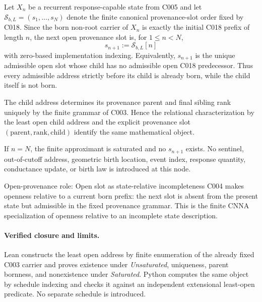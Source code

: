 Let $X_n$ be a recurrent response-capable state from C005 and let
$\mathcal S_{b,L}=(s_1,\ldots,s_N)$ denote the finite canonical provenance-slot
order fixed by C018.  Since the born non-root carrier of $X_n$ is exactly
the initial C018 prefix of length $n$, the next open provenance slot is, for
$1\le n<N$,
\[
  s_{n+1}:=\mathcal S_{b,L}[n]
\]
with zero-based implementation indexing.  Equivalently, $s_{n+1}$ is the
unique admissible open slot whose child has no admissible open C018 predecessor.
Thus every admissible address strictly before its child is already born, while
the child itself is not born.

The child address determines its provenance parent and final sibling rank
uniquely by the finite grammar of C003.  Hence the relational
characterization by the least open child address and the explicit provenance
slot $(\mathrm{parent},\mathrm{rank},\mathrm{child})$ identify the same
mathematical object.

If $n=N$, the finite approximant is saturated and no $s_{n+1}$ exists.  No
sentinel, out-of-cutoff address, geometric birth location, event index, response
quantity, conductance update, or birth law is introduced at this node.

\begin{cnnaInfoBox}{Open-provenance role: Open slot as state-relative incompleteness}
C004 makes openness relative to a current born prefix: the next slot is absent from the present state but admissible in the fixed provenance grammar.  This is the finite CNNA specialization of openness relative to an incomplete state description.
\end{cnnaInfoBox}

\paragraph*{Verified closure and limits.}
Lean constructs the least open address by finite enumeration of the already
fixed C003 carrier and proves existence under \emph{Unsaturated}, uniqueness,
parent bornness, and nonexistence under \emph{Saturated}.  Python computes the
same object by schedule indexing and checks it against an independent
extensional least-open predicate.  No separate schedule is introduced.
